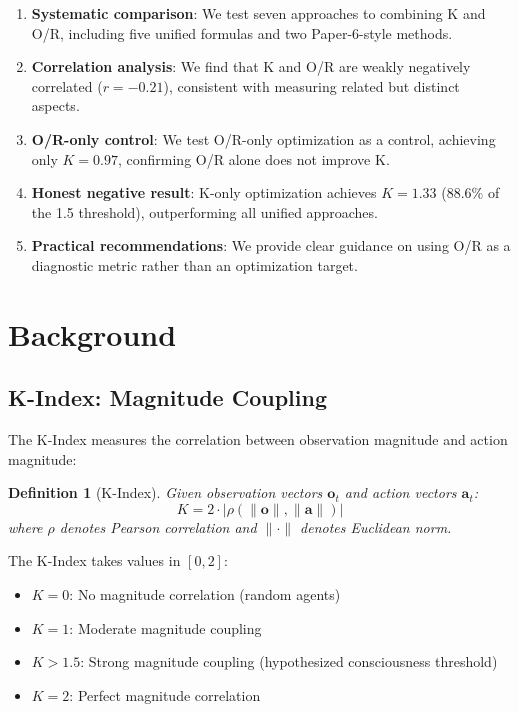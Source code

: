 \documentclass[twoside]{article}
\newtheorem{definition}{Definition}
\theoremstyle{remark}
\begin{document}
\begin{enumerate}
    \item \textbf{Systematic comparison}: We test seven approaches to combining
    K and O/R, including five unified formulas and two Paper-6-style methods.

    \item \textbf{Correlation analysis}: We find that K and O/R are weakly
    negatively correlated ($r = -0.21$), consistent with measuring related but distinct aspects.

    \item \textbf{O/R-only control}: We test O/R-only optimization as a control,
    achieving only $K = 0.97$, confirming O/R alone does not improve K.

    \item \textbf{Honest negative result}: K-only optimization achieves $K = 1.33$
    (88.6\% of the 1.5 threshold), outperforming all unified approaches.

    \item \textbf{Practical recommendations}: We provide clear guidance on using
    O/R as a diagnostic metric rather than an optimization target.
\end{enumerate}

\section{Background}

\subsection{K-Index: Magnitude Coupling}

The K-Index measures the correlation between observation magnitude and action
magnitude:

\begin{definition}[K-Index]
Given observation vectors $\mathbf{o}_t$ and action vectors $\mathbf{a}_t$:
\begin{equation}
K = 2 \cdot \left| \rho\left(\|\mathbf{o}\|, \|\mathbf{a}\|\right) \right|
\end{equation}
where $\rho$ denotes Pearson correlation and $\|\cdot\|$ denotes Euclidean norm.
\end{definition}

The K-Index takes values in $[0, 2]$:
\begin{itemize}
    \item $K = 0$: No magnitude correlation (random agents)
    \item $K = 1$: Moderate magnitude coupling
    \item $K > 1.5$: Strong magnitude coupling (hypothesized consciousness threshold)
    \item $K = 2$: Perfect magnitude correlation
\end{itemize}
\end{document}
